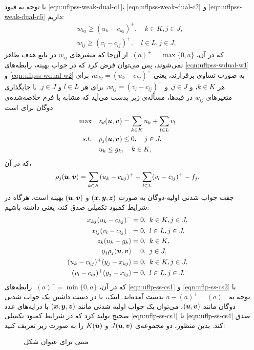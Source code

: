 با توجه به قیود \eqref{eqn:uflpss-weak-dual-c1}، \eqref{eqn:uflpss-weak-dual-c2} و \eqref{eqn:uflpss-weak-dual-c5} داریم:
\begin{align}
& w_{kj} \geq (u_k-c_{kj})^+, \quad k\in K, j\in J, \label{eqn:uflpss-wdual-w1}\\
& w_{lj} \geq (v_l-c_{lj})^+, \quad l\in L, j\in J, \label{eqn:uflpss-wdual-w2}
\end{align}
که در آن، $(a)^+=\max\{0,a\}$. از آن‌جا که متغیرهای $w_{ij}$ در تابع هدف ظاهر نمی‌شوند، پس می‌توان فرض کرد  که در جواب بهینه، رابطه‌های \eqref{eqn:uflpss-wdual-w1} و \eqref{eqn:uflpss-wdual-w2} به صورت تساوی برقرارند، یعنی $w_{kj} = (u_k-c_{kj})^+$، برای هر $k\in K$، و $j\in J$، و $w_{lj} = (v_l-c_{lj})^+$، برای هر $l\in L$ و $j\in J$. با جایگذاری متغیرهای $w_{ij}$ در قید‌ها، مسأله‌ی زیر بدست می‌آید که مشابه با فرم خلاصه‌شده‌ی دوگان برای  است
 \begin{align}
 \max  \quad   &  z_d({\boldsymbol u},{\boldsymbol v}) = \sum_{k\in K} u_k + \sum_{l\in L} v_l  \label{eqn:uflpss-con-wdual-obj} \\
 s. t. \quad     &   \rho_j({\boldsymbol u},{\boldsymbol v})\leq 0,        \quad j\in J,  \label{eqn:uflpss-con-wdual-c1}\\
               &   u_k \leq g_k,                      \quad k\in K, \label{eqn:uflpss-con-wdual-c2}
 \end{align}
 که در آن،
 \begin{align*}
 \rho_j({\boldsymbol u},{\boldsymbol v}) = \sum_{k\in K} (u_k-c_{kj})^+ +  \sum_{l\in L} (v_l-c_{lj})^+ - f_j.
 \end{align*}
 جفت جواب شدنی اولیه-دوگان به صورت $({\boldsymbol x},{\boldsymbol y},{\boldsymbol z})$  و $({\boldsymbol u},{\boldsymbol v})$ بهینه است، هرگاه در شرایط کمبود تکمیلی صدق کند، یعنی داشته باشیم:
\begin{align}
 x_{kj} ( u_k - c_{kj} )^- = 0, \; &\; k\in K, j\in J,                     \label{eqn:uflp-ss-cs1}\\
 x_{lj} ( v_l - c_{lj} )^- = 0, \; & \;l\in L, j\in J,                    \label{eqn:uflp-ss-cs2}\\
 z_k (u_k - g_k) = 0, \; & \;k\in K,                            \label{eqn:uflp-ss-cs3}\\
 y_j \rho_j({\boldsymbol u},{\boldsymbol v})  = 0, \; & \;j\in J,                                    \label{eqn:uflp-ss-cs4}\\
 ( u_k - c_{kj} )^+( y_j - x_{kj} ) =0, \; & \;k\in K, j\in J,  \label{eqn:uflp-ss-cs5}\\
 ( v_l - c_{lj} )^+( y_j - x_{lj} ) =0, \; & \;l\in L, j\in J,  \label{eqn:uflp-ss-cs6}
\end{align}
که در آن، $(a)^-=\min\{0,a\}$. رابطه‌های \eqref{eqn:uflp-ss-cs1} و \eqref{eqn:uflp-ss-cs2} با توجه به   $a-(a)^+=(a)^-$ بدست آمده‌اند. اینک، با در دست داشتن یک جواب شدنی دوگان مانند $({\boldsymbol u},{\boldsymbol v})$، می‌توان یک جواب اولیه شدنی مانند $({\boldsymbol x},{\boldsymbol y},{\boldsymbol z})$  با درایه‌های  عدد صحیح تولید کرد که در شرایط کمبود تکمیلی \eqref{eqn:uflp-ss-cs1} تا \eqref{eqn:uflp-ss-cs4} صدق کند.  بدین منظور، دو مجموعه‌ی $\bar J({\boldsymbol u},{\boldsymbol v})$ و $\bar K({\boldsymbol u})$ را به صورت زیر تعریف کنید: 


\begin{figure}[t]

\caption{متنی برای عنوان شکل}
\end{figure}
